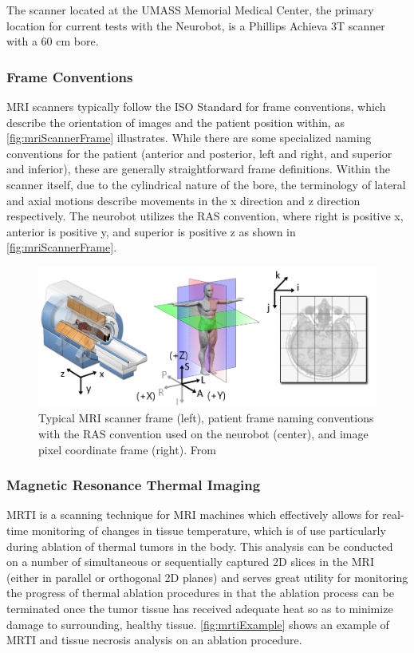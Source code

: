 \documentclass[12pt]{report}
\begin{document}
The scanner located at the UMASS Memorial Medical Center, the primary location for current tests with the Neurobot, is a Phillips Achieva 3T scanner with a 60 cm bore. 

\subsubsection{Frame Conventions}
MRI scanners typically follow the ISO Standard for frame conventions, which describe the orientation of images and the patient position within, as \autoref{fig:mriScannerFrame} illustrates. \cite{isoStandardMRI}  While there are some specialized naming conventions for the patient (anterior and posterior, left and right, and superior and inferior), these are generally straightforward frame definitions. Within the scanner itself, due to the cylindrical nature of the bore, the terminology of lateral and axial motions describe movements in the x direction and z direction respectively. The neurobot utilizes the RAS convention, where right is positive x, anterior is positive y, and superior is positive z as shown in \autoref{fig:mriScannerFrame}.

\begin{figure}[thpb]
	\centering
	\includegraphics[width=\textwidth]{images/mri_coordinate_systems.png}
    \caption{Typical MRI scanner frame (left), patient frame naming conventions with the RAS convention used on the neurobot (center), and image pixel coordinate frame (right). From \cite{mriFrames}}
    \label{fig:mriScannerFrame}
\end{figure}

\subsubsection{Magnetic Resonance Thermal Imaging}
\label{sec:mrti}
MRTI is a scanning technique for MRI machines which effectively allows for real-time monitoring of changes in tissue temperature, which is of use particularly during ablation of thermal tumors in the body. \cite{mrti} This analysis can be conducted on a number of simultaneous or sequentially captured 2D slices in the MRI (either in parallel or orthogonal 2D planes) and serves great utility for monitoring the progress of thermal ablation procedures in that the ablation process can be terminated once the tumor tissue has received adequate heat so as to minimize damage to surrounding, healthy tissue. \cite{mrtiAblation} \autoref{fig:mrtiExample} shows an example of MRTI and tissue necrosis analysis on an ablation procedure.
\end{document}
